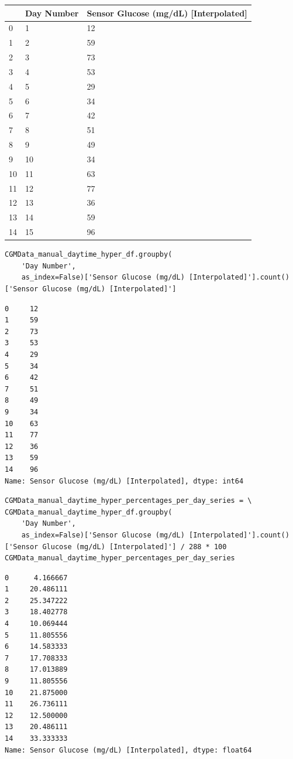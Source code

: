 \bigskip\noindent
\begin{tabular}{p{}p{}p{}}
\toprule
 & Day Number & Sensor Glucose (mg/dL) [Interpolated] \\
\hline
0 & 1 & 12 \\
\hline
1 & 2 & 59 \\
\hline
2 & 3 & 73 \\
\hline
3 & 4 & 53 \\
\hline
4 & 5 & 29 \\
\hline
5 & 6 & 34 \\
\hline
6 & 7 & 42 \\
\hline
7 & 8 & 51 \\
\hline
8 & 9 & 49 \\
\hline
9 & 10 & 34 \\
\hline
10 & 11 & 63 \\
\hline
11 & 12 & 77 \\
\hline
12 & 13 & 36 \\
\hline
13 & 14 & 59 \\
\hline
14 & 15 & 96 \\
\hline
\bottomrule
\end{tabular}

\bigskip

\begin{verbatim}
CGMData_manual_daytime_hyper_df.groupby(
    'Day Number',
    as_index=False)['Sensor Glucose (mg/dL) [Interpolated]'].count()['Sensor Glucose (mg/dL) [Interpolated]']
\end{verbatim}

\begin{verbatim}
0     12
1     59
2     73
3     53
4     29
5     34
6     42
7     51
8     49
9     34
10    63
11    77
12    36
13    59
14    96
Name: Sensor Glucose (mg/dL) [Interpolated], dtype: int64
\end{verbatim}

\begin{verbatim}
CGMData_manual_daytime_hyper_percentages_per_day_series = \
CGMData_manual_daytime_hyper_df.groupby(
    'Day Number',
    as_index=False)['Sensor Glucose (mg/dL) [Interpolated]'].count()['Sensor Glucose (mg/dL) [Interpolated]'] / 288 * 100
CGMData_manual_daytime_hyper_percentages_per_day_series
\end{verbatim}

\begin{verbatim}
0      4.166667
1     20.486111
2     25.347222
3     18.402778
4     10.069444
5     11.805556
6     14.583333
7     17.708333
8     17.013889
9     11.805556
10    21.875000
11    26.736111
12    12.500000
13    20.486111
14    33.333333
Name: Sensor Glucose (mg/dL) [Interpolated], dtype: float64
\end{verbatim}

